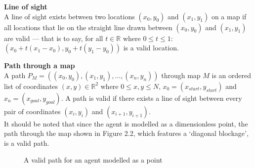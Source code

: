 \documentclass[12pt,notitlepage]{report}
\begin{document}
\begin{description}
\item{\bfseries Line of sight}\\
A line of sight exists between two locations $(x_{0},y_{0})$ and $(x_{1},y_{1})$ on a map if all locations that lie on the straight line drawn between $(x_{0},y_{0})$ and $(x_{1},y_{1})$ are valid --- that is to say, for all $t \in \mathbb{R}$ where $0 \leq t \leq 1$: $(x_{0} + t(x_{1}-x_{0}),y_{0} + t(y_{1}-y_{0}))$ is a valid location.
\end{description}

\begin{description}
\item{\bfseries Path through a map}\\
A path  $P_{M} = ((x_{0},y_{0}), (x_{1},y_{1}), \ldots, (x_{n},y_{n}))$ through map $M$ is an ordered list of coordinates $(x,y) \in \mathbb{R}^{2}$ where $0 \leq x,y \leq N$, $x_{0}=(x_{start},y_{start})$ and $x_{n}=(x_{goal},y_{goal})$. A path is valid if there exists a line of sight between every pair of coordinates $(x_{i},y_{i})$ and $(x_{i+1},y_{i+1})$.\\

\noindent
It should be noted that since the agent is modelled as a dimensionless point, the path through the map shown in Figure 2.2, which features a `diagonal blockage', is a valid path.\\

\end{description}

\begin{figure}[h]
    \centering
  \caption{A valid path for an agent modelled as a point}
\end{figure}
\end{document}
